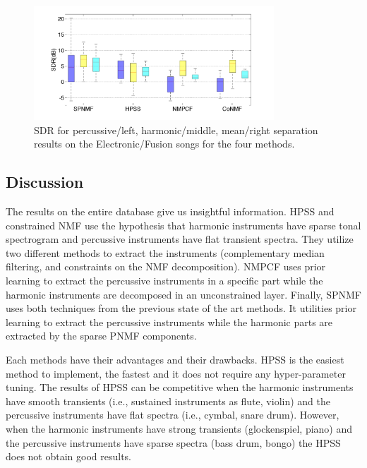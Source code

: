 \documentclass[journal]{IEEEtran}
\begin{document}
\begin{figure}[htb]

  \centering 
  \includegraphics[width=9cm]{fig/ElectroFusionSDR.png}
  \caption{\label{ElectroFusionSDR} SDR for percussive/left, harmonic/middle, mean/right separation results on the Electronic/Fusion songs for the four methods.}
  
\end{figure}

\subsection{Discussion}\label{discu}

The results on the entire database give us insightful information.
HPSS and constrained NMF use the hypothesis that harmonic instruments have sparse tonal spectrogram and percussive instruments have flat transient spectra. They utilize two different methods to extract the instruments (complementary median filtering, and constraints on the NMF decomposition).
NMPCF uses prior learning to extract the percussive instruments in a specific part while the harmonic instruments are decomposed in an unconstrained layer. 
Finally, SPNMF uses both techniques from the previous state of the art methods. It utilities prior learning to extract the percussive instruments while the harmonic parts are extracted by the sparse PNMF components.



Each methods have their advantages and their drawbacks. HPSS is the easiest method to implement, the fastest and it does not require any hyper-parameter tuning. The results of HPSS can be competitive when the harmonic instruments have smooth transients (i.e., sustained instruments as flute, violin) and the percussive instruments have flat spectra (i.e., cymbal, snare drum). However, when the harmonic instruments have strong transients (glockenspiel, piano) and the percussive instruments have sparse spectra (bass drum, bongo) the HPSS does not obtain good results. 
\end{document}
